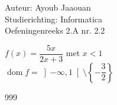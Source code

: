 \documentclass[a4paper]{article}
\begin{document}
  
\noindent \large Auteur: Ayoub Jaaouan          \\
\noindent \large Studierichting: Informatica   \\ 
\noindent \large Oefeningenreeks 2.A nr. 2.2   \\

\medskip

\normalsize



$f(x) = \dfrac{5x}{2x+3} $ met $ x < 1 $ \\

$\operatorname{dom}f = \left]-\infty,1\right[\setminus\left\{-\dfrac{3}{2}\right\}$\\




\begin{thebibliography}{999}
\end{thebibliography}
\end{document}
